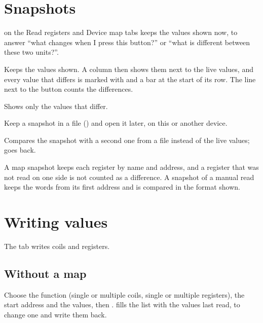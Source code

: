 \section{Snapshots}
\label{sec:snapshots}

 on the Read registers and Device map tabs keeps the values shown
now, to answer ``what changes when I press this button?'' or ``what is
different between these two units?''.

\begin{description}[style=nextline, leftmargin=0pt, font=\intermedium]
  \item[Take snapshot] Keeps the values shown. A  column then
    shows them next to the live values, and every value that differs is marked
    with  and a bar at the start of its row. The line next to the button
    counts the differences.
  \item[Only differences] Shows only the values that differ.
  \item[Save snapshot…, Open snapshot…] Keep a snapshot in a file
    () and open it later, on this or another device.
  \item[Compare with a saved snapshot…] Compares the snapshot with a second
    one from a file instead of the live values;  goes back.
\end{description}

A map snapshot keeps each register by name and address, and a register that
was not read on one side is not counted as a difference. A snapshot of a manual
read keeps the words from its first address and is compared in the format
shown.

\section{Writing values}
\label{sec:write}

The  tab writes coils and registers.

\subsection{Without a map}

Choose the function (single or multiple coils, single or multiple
registers), the start address and the values, then .
 fills the list with the values last read, to
change one and write them back.

